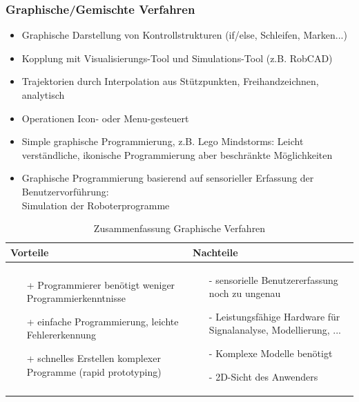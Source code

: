 \subsubsection{Graphische/Gemischte Verfahren}
\begin{itemize}
\item Graphische Darstellung von Kontrollstrukturen (if/else, Schleifen,
Marken...)
\item Kopplung mit Visualisierungs-Tool und Simulations-Tool (z.B. RobCAD)
\item  Trajektorien durch Interpolation aus Stützpunkten, Freihandzeichnen,
analytisch
\item Operationen Icon- oder Menu-gesteuert
\item Simple graphische Programmierung, z.B. Lego Mindstorms:
Leicht verständliche, ikonische Programmierung aber beschränkte Möglichkeiten
\item Graphische Programmierung basierend auf sensorieller Erfassung der
Benutzervorführung:\\ Simulation der Roboterprogramme
\end{itemize}
\begin{table}[hbt]
\centering
\begin{tabular}{|p{7.5cm}|p{7.5cm}|}
\hline
Vorteile & Nachteile\\
\hline
\vspace{-5mm}
\begin{itemize}
\setlength\itemsep{0em}
\item[+] Programmierer benötigt weniger Programmierkenntnisse
\item[+] einfache Programmierung, leichte Fehlererkennung
\item[+] schnelles Erstellen komplexer Programme (rapid prototyping)
\end{itemize}
 &
 \vspace{-5mm}
\begin{itemize}
\setlength\itemsep{0em}
\item[-] sensorielle Benutzererfassung noch zu ungenau
\item[-] Leistungsfähige Hardware für Signalanalyse, Modellierung, ...
\item[-] Komplexe Modelle benötigt
\item[-] 2D-Sicht des Anwenders
\end{itemize}\\
\hline
\end{tabular}
\caption{Zusammenfassung Graphische Verfahren}
\label{tab:textprog}
\end{table}
\newpage
